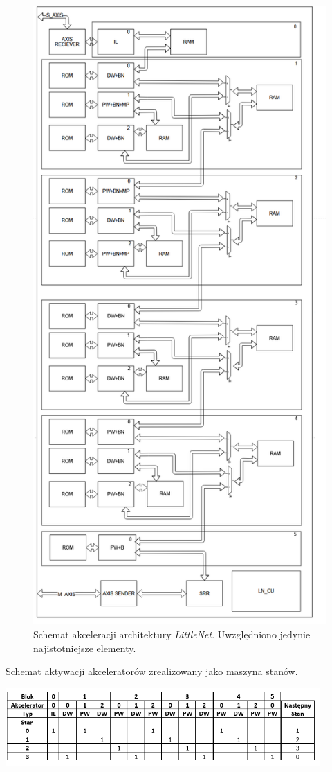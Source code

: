 \begin{figure}
    \centering
    \includegraphics[height=0.9\textheight]{images/LNACC.png}
    \caption{Schemat akceleracji architektury \emph{LittleNet}. Uwzględniono jedynie najistotniejsze elementy.}
    \label{fig:LNACC}
\end{figure}
\begin{table}
    \centering
    \caption{Schemat aktywacji akceleratorów zrealizowany jako maszyna stanów.}
    \label{tab:LNACC}
    \includegraphics[width=0.9\textwidth]{images/acc_activ.png}
\end{table}

